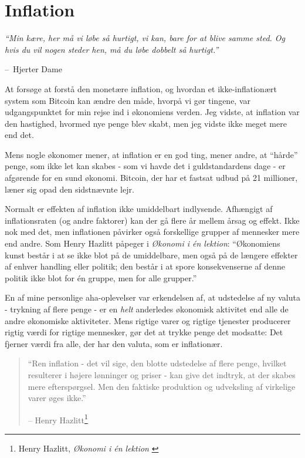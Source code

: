 \documentclass[paper=6in:9in,pagesize=pdftex,headinclude=on,footinclude=on,12pt]{scrbook}
\makeatletter
\newenvironment{chapquote}[2][4em]{\setlength{\@tempdima}{#1}%
   \def\chapquote@author{#2}%
   \parshape 1 \@tempdima \dimexpr\textwidth-2\@tempdima\relax%
   \itshape}{\par\normalfont\hfill--\ \chapquote@author\hspace*{\@tempdima}\par\bigskip}
\makeatother
\begin{document}
\chapter{Inflation}
\label{les:9}

\begin{chapquote}{Hjerter Dame} \enquote{Min kære, her må vi løbe så hurtigt, vi kan, bare for at blive samme sted. Og hvis du vil nogen steder hen, må du løbe dobbelt så hurtigt.} \end{chapquote}

At forsøge at forstå den monetære inflation, og hvordan et ikke-inflationært system som Bitcoin kan ændre den måde, hvorpå vi gør tingene, var udgangspunktet for min rejse ind i økonomiens verden. Jeg vidste, at inflation var den hastighed, hvormed nye penge blev skabt, men jeg vidste ikke meget mere end det.

Mens nogle økonomer mener, at inflation er en god ting, mener andre, at \enquote{hårde} penge, som ikke let kan skabes - som vi havde det i guldstandardens dage - er afgørende for en sund økonomi. Bitcoin, der har et fastsat udbud på 21 millioner, læner sig opad den sidstnævnte lejr.

Normalt er effekten af inflation ikke umiddelbart indlysende. Afhængigt af inflationsraten (og andre faktorer) kan der gå flere år mellem årsag og effekt. Ikke nok med det, men inflationen påvirker også forskellige grupper af mennesker mere end andre. Som Henry Hazlitt påpeger i \textit{Økonomi i \'en lektion}: \enquote{Økonomiens kunst består i at se ikke blot på de umiddelbare, men også på de længere effekter af enhver handling eller politik; den består i at spore konsekvenserne af denne politik ikke blot for \'en gruppe, men for alle grupper.}

En af mine personlige aha-oplevelser var erkendelsen af, at udstedelse af ny valuta - trykning af flere penge - er en \textit{helt} anderledes økonomisk aktivitet end alle de andre økonomiske aktiviteter. Mens rigtige varer og rigtige tjenester producerer rigtig værdi for rigtige mennesker, gør det at trykke penge det modsatte: Det fjerner værdi fra alle, der har den valuta, som er inflationær.\begin{quotation}\begin{samepage} \enquote{Ren inflation - det vil sige, den blotte udstedelse af flere penge, hvilket resulterer i højere lønninger og priser - kan give det indtryk, at der skabes mere efterspørgsel. Men den faktiske produktion og udveksling af virkelige varer øges ikke.} \begin{flushright} -- Henry Hazlitt\footnote{Henry Hazlitt, \textit{Økonomi i \'en lektion} \cite{hazlitt}}
\end{flushright}\end{samepage}\end{quotation}
\end{document}
